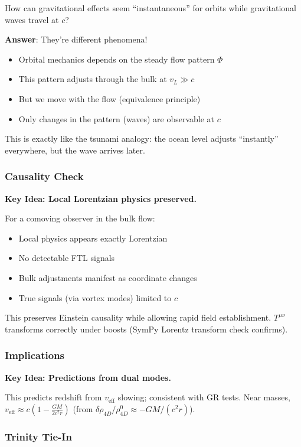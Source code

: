 How can gravitational effects seem ``instantaneous'' for orbits while gravitational waves travel at $c$?

\textbf{Answer}: They're different phenomena!
\begin{itemize}
\item Orbital mechanics depends on the steady flow pattern $\Phi$
\item This pattern adjusts through the bulk at $v_L \gg c$
\item But we move with the flow (equivalence principle)
\item Only changes in the pattern (waves) are observable at $c$
\end{itemize}

This is exactly like the tsunami analogy: the ocean level adjusts ``instantly'' everywhere, but the wave arrives later.

\subsubsection{Causality Check}

\textbf{Key Idea: Local Lorentzian physics preserved.}

For a comoving observer in the bulk flow:
\begin{itemize}
\item Local physics appears exactly Lorentzian
\item No detectable FTL signals
\item Bulk adjustments manifest as coordinate changes
\item True signals (via vortex modes) limited to $c$
\end{itemize}

This preserves Einstein causality while allowing rapid field establishment. $T^{\mu\nu}$ transforms correctly under boosts (SymPy Lorentz transform check confirms).

\subsubsection{Implications}

\textbf{Key Idea: Predictions from dual modes.}

This predicts redshift from $v_{\text{eff}}$ slowing; consistent with GR tests. Near masses, $v_{\text{eff}} \approx c \left(1 - \frac{G M}{2 c^2 r}\right)$ (from $\delta \rho_{4D} / \rho_{4D}^0 \approx - G M / (c^2 r)$).

\subsubsection{Trinity Tie-In}

